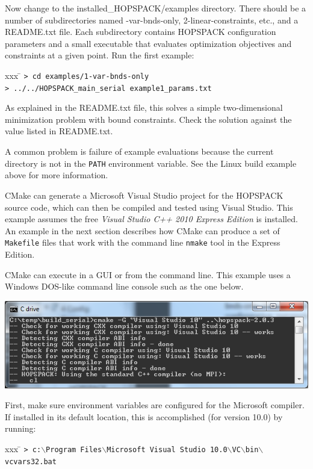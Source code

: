 Now change to the {\sf installed\_HOPSPACK/examples} directory.
There should be a number of
subdirectories named {-var-bnds-only, 2-linear-constraints}, etc.,
and a {\sf README.txt} file.  Each subdirectory contains HOPSPACK
configuration parameters and a small executable that evaluates optimization
objectives and constraints at a given point.
Run the first example:
\vspace{-11pt}
\begin{tabbing}
  xxx \= \kill
  \> {\tt > cd examples/1-var-bnds-only} \\
  \> {\tt > ../../HOPSPACK\_main\_serial example1\_params.txt}
\end{tabbing}
\vspace{-11pt}
As explained in the {\sf README.txt} file, this solves a simple two-dimensional
minimization problem with bound constraints.  Check the solution against
the value listed in {\sf README.txt}.

A common problem is failure of example evaluations because
the current directory is not in the {\tt PATH} environment variable.
See the Linux build example above for more information.


\bigskip
{}
CMake can generate a Microsoft Visual Studio project for the HOPSPACK
source code, which can then be compiled and tested using Visual Studio.
This example assumes the free {\it Visual Studio C++ 2010 Express Edition}
is installed.
An example in the next section describes how CMake can produce a set of
{\tt Makefile} files that work with the command line {\tt nmake} tool in the
Express Edition.

CMake can execute in a GUI or from the command line.  This example uses
a Windows DOS-like command line console such as the one below.

\begin{center}
\includegraphics[width=5.5in]{winconsole_cmake_msvc.png}
\end{center}

First, make sure environment variables are configured for the Microsoft compiler.
If installed in its default location, this is accomplished (for version 10.0)
by running:
\vspace{-11pt}
\begin{tabbing}
  xxx \= \kill
  \> {\tt > c:$\backslash$Program Files$\backslash$Microsoft Visual Studio 10.0$\backslash$VC$\backslash$bin$\backslash$vcvars32.bat}
\end{tabbing}


